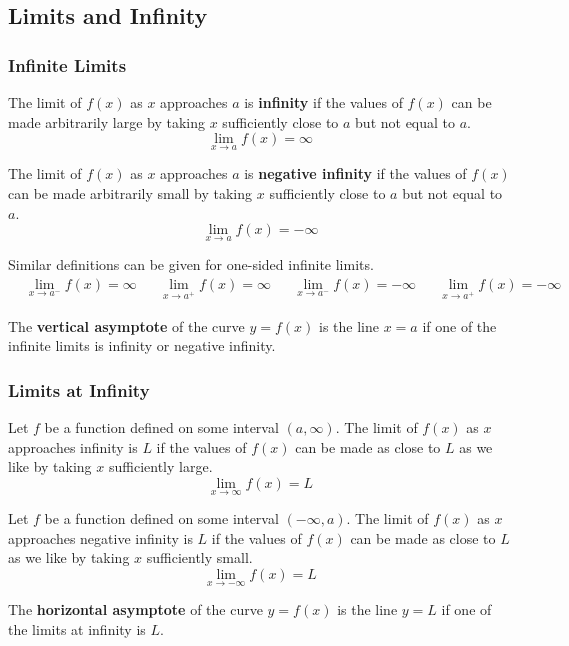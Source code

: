 \subsection{Limits and Infinity}
\subsubsection{Infinite Limits}
\begin{definition}
    The limit of \(f(x)\) as \(x\) approaches \(a\) is \textbf{infinity} if
    the values of \(f(x)\) can be made arbitrarily large by taking \(x\)
    sufficiently close to \(a\) but not equal to \(a\).
    \[\lim_{x\to a}f(x)=\infty\]
\end{definition}
\begin{definition}
    The limit of \(f(x)\) as \(x\) approaches \(a\) is \textbf{negative infinity}
    if the values of \(f(x)\) can be made arbitrarily small by taking \(x\)
    sufficiently close to \(a\) but not equal to \(a\).
    \[\lim_{x\to a}f(x)=-\infty\]
\end{definition}
Similar definitions can be given for one-sided infinite limits.
\begin{align*}
    &\lim_{x\to a^-}f(x)=\infty&&\lim_{x\to a^+}f(x)=\infty&
    &\lim_{x\to a^-}f(x)=-\infty&&\lim_{x\to a^+}f(x)=-\infty&
\end{align*}
\begin{definition}
    The \textbf{vertical asymptote} of the curve \(y=f(x)\) is the line \(x=a\)
    if one of the infinite limits is infinity or negative infinity.
\end{definition}

\subsubsection{Limits at Infinity}
\begin{definition}
    Let \(f\) be a function defined on some interval \((a,\infty)\).
    The limit of \(f(x)\) as \(x\) approaches infinity is \(L\) if the values
    of \(f(x)\) can be made as close to \(L\) as we like by taking \(x\)
    sufficiently large.
    \[\lim_{x\to \infty}f(x)=L\]
\end{definition}
\begin{definition}
    Let \(f\) be a function defined on some interval \((-\infty,a)\).
    The limit of \(f(x)\) as \(x\) approaches negative infinity is \(L\) if
    the values of \(f(x)\) can be made as close to \(L\) as we like by taking \(x\)
    sufficiently small.
    \[\lim_{x\to -\infty}f(x)=L\]
\end{definition}
\begin{definition}
    The \textbf{horizontal asymptote} of the curve \(y=f(x)\) is the line \(y=L\)
    if one of the limits at infinity is \(L\).
\end{definition}

